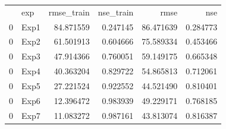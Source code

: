 \begin{tabular}{llrrrr}
 & exp & rmse_train & nse_train & rmse & nse \\
0 & Exp1 & 84.871559 & 0.247145 & 86.471639 & 0.284773 \\
0 & Exp2 & 61.501913 & 0.604666 & 75.589334 & 0.453466 \\
0 & Exp3 & 47.914366 & 0.760051 & 59.149175 & 0.665348 \\
0 & Exp4 & 40.363204 & 0.829722 & 54.865813 & 0.712061 \\
0 & Exp5 & 27.221524 & 0.922552 & 44.521490 & 0.810401 \\
0 & Exp6 & 12.396472 & 0.983939 & 49.229171 & 0.768185 \\
0 & Exp7 & 11.083272 & 0.987161 & 43.813074 & 0.816387 \\
\end{tabular}

